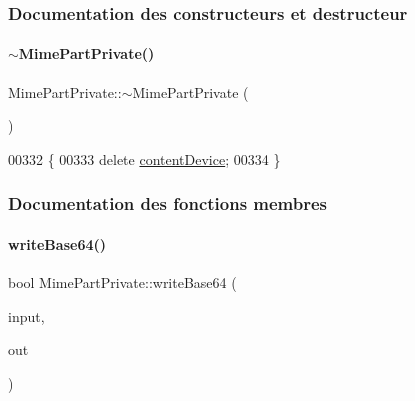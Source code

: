 \subsubsection{Documentation des constructeurs et destructeur}
\mbox{\label{class_simple_mail_1_1_mime_part_private_ad2003c3ac13e03f8abc76392cbba9e1d}} 
\paragraph{\texorpdfstring{$\sim$\+Mime\+Part\+Private()}{~MimePartPrivate()}}
{\footnotesize\ttfamily Mime\+Part\+Private\+::$\sim$\+Mime\+Part\+Private (\begin{DoxyParamCaption}{ }\end{DoxyParamCaption})\hspace{0.3cm}{\ttfamily [virtual]}}


\begin{DoxyCode}
00332 \{
00333     \textcolor{keyword}{delete} \hyperlink{class_simple_mail_1_1_mime_part_private_a713cdb28a4dff7bdca3148b7815f4fb0}{contentDevice};
00334 \}
\end{DoxyCode}


\subsubsection{Documentation des fonctions membres}
\mbox{\label{class_simple_mail_1_1_mime_part_private_ab3c8a3c921311eabdb608c6396d535a6}} 
\paragraph{\texorpdfstring{write\+Base64()}{writeBase64()}}
{\footnotesize\ttfamily bool Mime\+Part\+Private\+::write\+Base64 (\begin{DoxyParamCaption}\item[{Q\+I\+O\+Device $\ast$}]{input,  }\item[{Q\+I\+O\+Device $\ast$}]{out }\end{DoxyParamCaption})}


